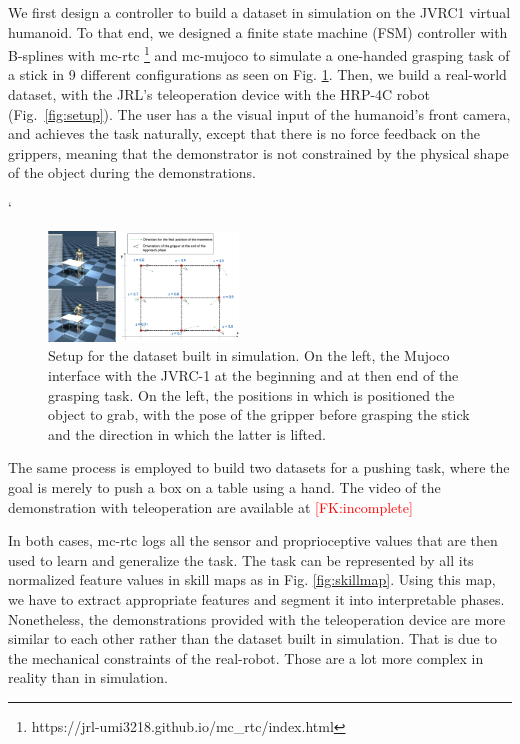 \documentclass[conference]{IEEEtran}
\newcommand{\fk}[1]{\textcolor{red}{[FK:#1]}}
\begin{document}
 We first design a controller to build a dataset in  simulation on the JVRC1 virtual humanoid. To that end, we designed a finite state machine (FSM) controller with B-splines with mc-rtc \footnote{https://jrl-umi3218.github.io/mc_rtc/index.html} and mc-mujoco \cite{singh2023mc} to simulate a one-handed grasping task of a stick in 9 different configurations as seen on Fig. \ref{fig:simSetup}. Then, we build a real-world dataset, with the JRL's teleoperation device  with the HRP-4C robot (Fig.~\ref{fig:setup}). The user has a the visual input of the humanoid's front camera, and achieves the task naturally, except that there is no force  feedback on the grippers, meaning that the demonstrator is not constrained by the physical shape of the object during the demonstrations.

 `\begin{figure}[ht]
  \centering
  \includegraphics[width=0.45\textwidth]{img/simSetup4.png}
  \caption{Setup for the dataset built in simulation. On the left, the Mujoco interface with the JVRC-1 \cite{jvrc} at the beginning and at then end of the grasping task. On the left, the positions in which is positioned the object to grab, with the pose of the gripper before grasping the stick and the direction in which the latter is lifted.}
  \label{fig:simSetup}
\end{figure}

 The same process is employed to build two datasets for a pushing task, where the goal is merely to push a box on a table using a hand. The video of the demonstration with teleoperation are available at \fk{incomplete}

 In both cases, mc-rtc logs all the sensor and proprioceptive values that are then used to learn and generalize the task. The task can be represented by all its normalized feature values in skill maps as in Fig. \ref{fig:skillmap}. Using this map, we have to extract appropriate features and segment it into interpretable phases. Nonetheless, the demonstrations provided with the teleoperation device are more similar to each other rather than the dataset built in simulation. That is due to the mechanical constraints of the real-robot. Those are a lot more complex in reality than in simulation.
\end{document}
